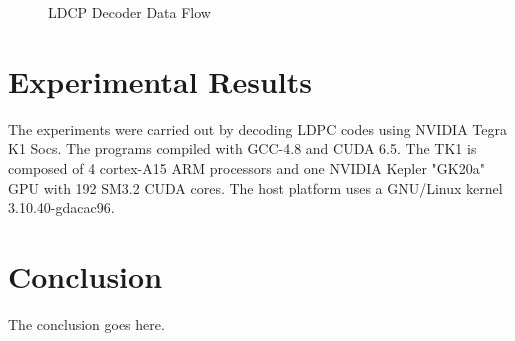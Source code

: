 \documentclass[conference]{IEEEtran}
\begin{document}
\begin{figure}[h]
\begin{centering}
\caption[width=.3\textwidth]{LDCP Decoder Data Flow}
\label{fig_total}
\end{centering}
\end{figure}

\section{Experimental Results} \label{sec4}

The experiments were carried out by decoding LDPC codes using NVIDIA Tegra K1 Socs. The programs compiled with GCC-4.8 and CUDA 6.5. The TK1 is composed of 4 cortex-A15 ARM processors and one NVIDIA Kepler "GK20a" GPU with 192 SM3.2 CUDA cores. The host platform uses a GNU/Linux kernel 3.10.40-gdacac96. 

\section{Conclusion}
The conclusion goes here.

\newpage






\end{document}
